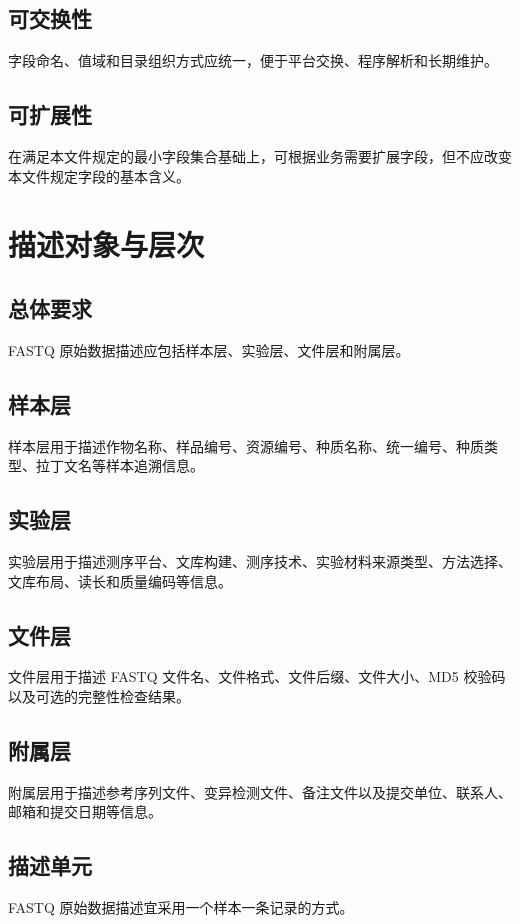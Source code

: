 \section{可交换性}
字段命名、值域和目录组织方式应统一，便于平台交换、程序解析和长期维护。

\section{可扩展性}
在满足本文件规定的最小字段集合基础上，可根据业务需要扩展字段，但不应改变本文件规定字段的基本含义。

\chapter{描述对象与层次}
\section{总体要求}
FASTQ 原始数据描述应包括样本层、实验层、文件层和附属层。

\section{样本层}
样本层用于描述作物名称、样品编号、资源编号、种质名称、统一编号、种质类型、拉丁文名等样本追溯信息。

\section{实验层}
实验层用于描述测序平台、文库构建、测序技术、实验材料来源类型、方法选择、文库布局、读长和质量编码等信息。

\section{文件层}
文件层用于描述 FASTQ 文件名、文件格式、文件后缀、文件大小、MD5 校验码以及可选的完整性检查结果。

\section{附属层}
附属层用于描述参考序列文件、变异检测文件、备注文件以及提交单位、联系人、邮箱和提交日期等信息。

\section{描述单元}
FASTQ 原始数据描述宜采用一个样本一条记录的方式。


